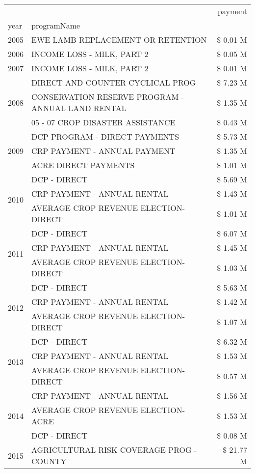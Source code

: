 \begin{tabular}{llr}
\toprule
 &  & payment \\
year & programName &  \\
\midrule
2005 & EWE LAMB REPLACEMENT OR RETENTION & \$ 0.01 M \\
\cline{1-3}
2006 & INCOME LOSS - MILK, PART 2 & \$ 0.05 M \\
\cline{1-3}
2007 & INCOME LOSS - MILK, PART 2 & \$ 0.01 M \\
\cline{1-3}
\multirow[t]{3}{*}{2008} & DIRECT AND COUNTER CYCLICAL PROG & \$ 7.23 M \\
 & CONSERVATION RESERVE PROGRAM - ANNUAL LAND RENTAL & \$ 1.35 M \\
 & 05 - 07 CROP DISASTER ASSISTANCE & \$ 0.43 M \\
\cline{1-3}
\multirow[t]{3}{*}{2009} & DCP PROGRAM - DIRECT PAYMENTS & \$ 5.73 M \\
 & CRP PAYMENT - ANNUAL PAYMENT & \$ 1.35 M \\
 & ACRE DIRECT PAYMENTS & \$ 1.01 M \\
\cline{1-3}
\multirow[t]{3}{*}{2010} & DCP - DIRECT & \$ 5.69 M \\
 & CRP PAYMENT - ANNUAL RENTAL & \$ 1.43 M \\
 & AVERAGE CROP REVENUE ELECTION-DIRECT & \$ 1.01 M \\
\cline{1-3}
\multirow[t]{3}{*}{2011} & DCP - DIRECT & \$ 6.07 M \\
 & CRP PAYMENT - ANNUAL RENTAL & \$ 1.45 M \\
 & AVERAGE CROP REVENUE ELECTION-DIRECT & \$ 1.03 M \\
\cline{1-3}
\multirow[t]{3}{*}{2012} & DCP - DIRECT & \$ 5.63 M \\
 & CRP PAYMENT - ANNUAL RENTAL & \$ 1.42 M \\
 & AVERAGE CROP REVENUE ELECTION-DIRECT & \$ 1.07 M \\
\cline{1-3}
\multirow[t]{3}{*}{2013} & DCP - DIRECT & \$ 6.32 M \\
 & CRP PAYMENT - ANNUAL RENTAL & \$ 1.53 M \\
 & AVERAGE CROP REVENUE ELECTION-DIRECT & \$ 0.57 M \\
\cline{1-3}
\multirow[t]{3}{*}{2014} & CRP PAYMENT - ANNUAL RENTAL & \$ 1.56 M \\
 & AVERAGE CROP REVENUE ELECTION-ACRE & \$ 1.53 M \\
 & DCP - DIRECT & \$ 0.08 M \\
\cline{1-3}
\multirow[t]{3}{*}{2015} & AGRICULTURAL RISK COVERAGE PROG - COUNTY & \$ 21.77 M \\

\end{tabular}
